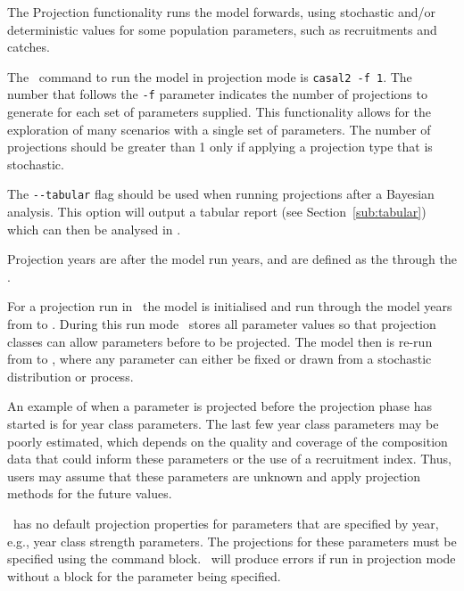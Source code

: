\subsubsection{}\label{sec:projection}

The Projection functionality runs the model forwards, using stochastic and/or deterministic values for some population parameters, such as recruitments and catches.

The \CNAME\ command to run the model in projection mode is \texttt{casal2 -f 1}. The number that follows the \texttt{-f} parameter indicates the number of projections to generate for each set of parameters supplied. This functionality allows for the exploration of many scenarios with a single set of parameters. The number of projections should be greater than 1 only if applying a projection type that is stochastic.

The \texttt{-{}-tabular} flag should be used when running projections after a Bayesian analysis. This option will output a tabular report (see Section~\ref{sub:tabular}) which can then be analysed in \R.

Projection years are after the model run years, and are defined as the  through the .

For a projection run in \CNAME\, the model is initialised and run through the model years from  to . During this run mode \CNAME\ stores all parameter values so that projection classes can allow parameters before  to be projected. The model then is re-run from  to , where any parameter can either be fixed or drawn from a stochastic distribution or process.

An example of when a parameter is projected before the projection phase has started is for year class parameters. The last few year class parameters may be poorly estimated, which depends on the quality and coverage of the composition data that could inform these parameters or the use of a recruitment index. Thus, users may assume that these parameters are unknown and apply projection methods for the future values.

\CNAME\ has no default projection properties for parameters that are specified by year, e.g., year class strength parameters. The projections for these parameters must be specified using the  command block. \CNAME\ will produce errors if run in projection mode without a  block for the  parameter being specified.

